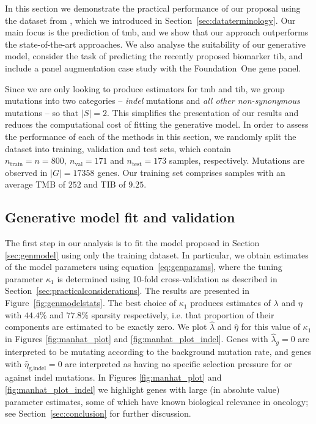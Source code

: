 \documentclass[12pt]{article}
\begin{document}
In this section we demonstrate the practical performance of our proposal using the dataset from \citet{campbell_distinct_2016}, which we introduced in Section~\ref{sec:dataterminology}. Our main focus is the prediction of \gls{tmb}, and we show that our approach outperforms the state-of-the-art approaches. We also analyse the suitability of our generative model, consider the task of predicting the recently proposed biomarker \gls{tib}, and include a panel augmentation case study with the Foundation~One gene panel.

Since we are only looking to produce estimators for \gls{tmb} and \gls{tib}, we group mutations into two categories -- \emph{indel} mutations and \emph{all other non-synonymous} mutations -- so that $|S|=2$.  This simplifies the presentation of our results and reduces the computational cost of fitting the generative model.  In order to assess the performance of each of the methods in this section, we randomly split the dataset into training, validation and test sets, which contain $n_{\text{train}} = n = 800, \ n_{\text{val}} =  171$ and $n_{\text{test}} = 173$ samples, respectively.  Mutations are observed in $|G| = 17358$ genes. Our training set comprises samples with an average TMB of $252$ and TIB of $9.25$. 


\subsection{Generative model fit and validation \label{sec:genmodelfit}}



The first step in our analysis is to fit the model proposed in Section \ref{sec:genmodel} using only the training dataset. In particular, we obtain estimates of the model parameters using equation~\eqref{eq:genparams}, where the tuning parameter $\kappa_1$ is determined using 10-fold cross-validation as described in Section~\ref{sec:practicalconsiderations}.  The results are presented in Figure~\ref{fig:genmodelstats}. The best choice of $\kappa_1$ produces estimates of $\lambda$ and $\eta$ with $44.4 \%$ and $77.8 \%$ sparsity respectively, i.e. that proportion of their components are estimated to be exactly zero. We plot $\hat{\lambda}$ and $\hat{\eta}$ for this value of $\kappa_1$ in Figures \ref{fig:manhat_plot} and \ref{fig:manhat_plot_indel}. Genes with $\hat{\lambda}_g = 0$ are interpreted to be mutating according to the background mutation rate, and genes with $\hat{\eta}_{\text{g,indel}} = 0$ are interpreted as having no specific selection pressure for or against indel mutations. In Figures \ref{fig:manhat_plot} and \ref{fig:manhat_plot_indel} we highlight genes with large (in absolute value) parameter estimates, some of which have known biological relevance in oncology; see Section~\ref{sec:conclusion} for further discussion.   
\end{document}
